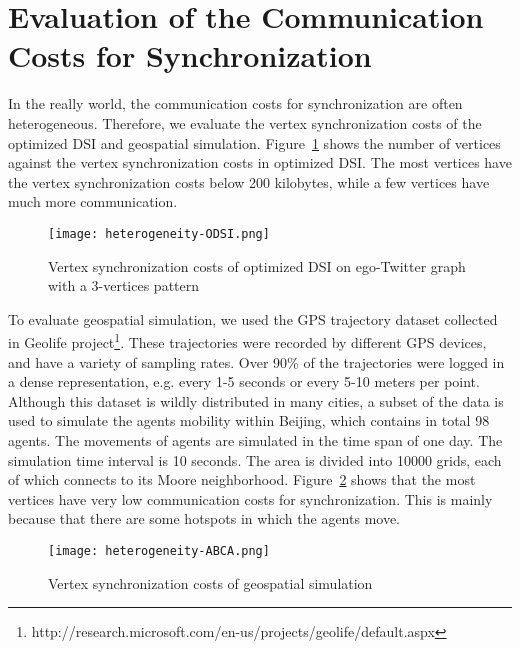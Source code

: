 \section{Evaluation of the Communication Costs for Synchronization}
\label{sec: evaluation-heterogeneity}

In the really world, the communication costs for synchronization are often heterogeneous. Therefore, we evaluate the vertex synchronization costs of the optimized DSI and geospatial simulation. Figure~\ref{fig:heterogeneity-ODSI} shows the number of vertices against the vertex synchronization costs in optimized DSI. The most vertices have the vertex synchronization costs below 200 kilobytes, while a few vertices have much more communication.

\begin{figure}[H]
  \begin{center}
    \texttt{[image: heterogeneity-ODSI.png]}
    \caption{Vertex synchronization costs of optimized DSI on ego-Twitter graph with a 3-vertices pattern}
    \label{fig:heterogeneity-ODSI}
  \end{center}
\end{figure}

To evaluate geospatial simulation, we used the GPS trajectory dataset collected in Geolife project\footnote{http://research.microsoft.com/en-us/projects/geolife/default.aspx}. These trajectories were recorded by different GPS devices, and have a variety of sampling rates. Over 90\% of the trajectories were logged in a dense representation, e.g. every 1-5 seconds or every 5-10 meters per point. Although this dataset is wildly distributed in many cities, a subset of the data is used to simulate the agents mobility within Beijing, which contains in total 98 agents. The movements of agents are simulated in the time span of one day. The simulation time interval is 10 seconds. The area is divided into 10000 grids, each of which connects to its Moore neighborhood. Figure~\ref{fig:heterogeneity-ABCA} shows that the most vertices have very low communication costs for synchronization. This is mainly because that there are some hotspots in which the agents move.

\begin{figure}[H]
  \begin{center}
    \texttt{[image: heterogeneity-ABCA.png]}
    \caption{Vertex synchronization costs of geospatial simulation}
    \label{fig:heterogeneity-ABCA}
  \end{center}
\end{figure}


